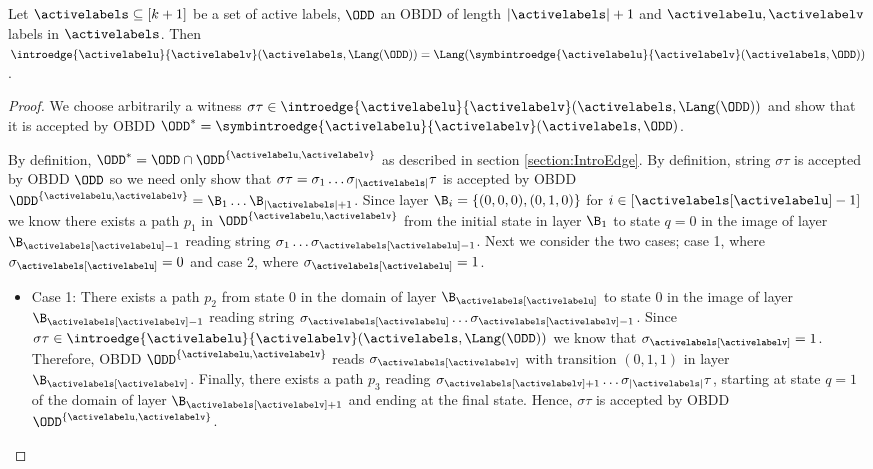 \begin{lemma}
\label{lemma:SymbolicEdgeAppendix}
Let $\activelabels \subseteq [k+1]$ be a set of active labels, $\ODD$ an OBDD of length $|\activelabels|+1$ and $\activelabelu, \activelabelv$ labels in $\activelabels$. Then  $\introedge{\activelabelu}{\activelabelv}(\activelabels, \Lang(\ODD))  = \Lang(\symbintroedge{\activelabelu}{\activelabelv}(\activelabels, \ODD))$.
\end{lemma}

\begin{proof}
    We choose arbitrarily a  witness $\sigma\tau \in \introedge{\activelabelu}{\activelabelv}(\activelabels,\Lang(\ODD))$ and show that it is accepted by OBDD $\ODD^* = \symbintroedge{\activelabelu}{\activelabelv}(\activelabels,\ODD)$.

    By definition, $\ODD^* = \ODD \cap \ODD^{\{\activelabelu,\activelabelv\}}$ as described in section \ref{section:IntroEdge}. By definition, string $\sigma\tau$ is accepted by OBDD $\ODD$ so we need only show that $\sigma\tau = \sigma_1\dots \sigma_{|\activelabels|}\tau$ is accepted by OBDD $\ODD^{\{\activelabelu,\activelabelv\}} = \B_1\dots \B_{|\activelabels|+1}$. Since layer $\B_i = \{(0,0,0), (0,1,0)\}$ for $i \in [\activelabels[\activelabelu]-1]$ we know there exists a path $p_1$ in $\ODD^{\{\activelabelu,\activelabelv\}}$ from the initial state in layer $\B_1$ to state $q = 0$ in the image of layer $\B_{\activelabels[\activelabelu]-1}$ reading string $\sigma_1\dots \sigma_{\activelabels[\activelabelu]-1}$. Next we consider the two cases; case 1, where $\sigma_{\activelabels[\activelabelu]} = 0$ and case 2, where $\sigma_{\activelabels[\activelabelu]} = 1$.

    \begin{itemize}
        \item Case 1: There exists a path $p_2$ from state $0$ in the domain of layer $\B_{\activelabels[\activelabelu]}$ to state $0$ in the image of layer $\B_{\activelabels[\activelabelv]-1}$ reading string $\sigma_{\activelabels[\activelabelu]}\dots \sigma_{\activelabels[\activelabelv]-1}$. Since $\sigma\tau \in \introedge{\activelabelu}{\activelabelv}(\activelabels,\Lang(\ODD))$ we know that $\sigma_{\activelabels[\activelabelv]} = 1$. Therefore, OBDD $\ODD^{\{\activelabelu,\activelabelv\}}$ reads $\sigma_{\activelabels[\activelabelv]}$ with transition $(0,1,1)$ in layer $\B_{\activelabels[\activelabelv]}$. Finally, there exists a path $p_3$ reading $\sigma_{\activelabels[\activelabelv] + 1}\dots \sigma_{|\activelabels|}\tau$, starting at state $q=1$ of the domain of layer $\B_{\activelabels[\activelabelv] + 1}$ and ending at the final state. Hence, $\sigma\tau$ is accepted by OBDD $\ODD^{\{\activelabelu,\activelabelv\}}$.
        

\end{itemize}
\end{proof}
